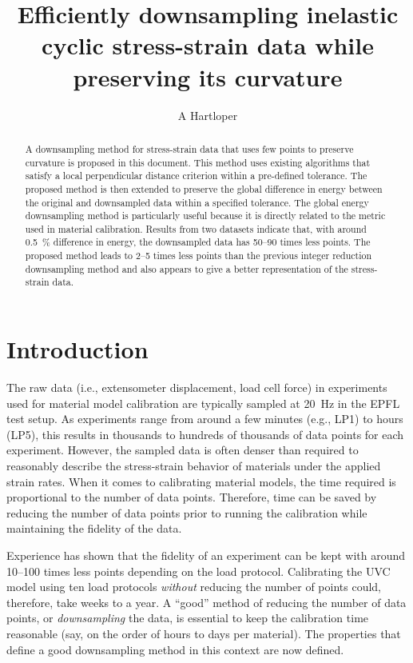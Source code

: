 \documentclass[a4paper,11pt]{article}
\title{Efficiently downsampling inelastic cyclic stress-strain data while preserving its curvature}
\author{A Hartloper}
\begin{document}
\maketitle

\begin{abstract}
    A downsampling method for stress-strain data that uses few points to preserve curvature is proposed in this document.
    This method uses existing algorithms that satisfy a local perpendicular distance criterion within a pre-defined tolerance.
    The proposed method is then extended to preserve the global difference in energy between the original and downsampled data within a specified tolerance.
    The global energy downsampling method is particularly useful because it is directly related to the metric used in material calibration.
    Results from two datasets indicate that, with around 0.5~\% difference in energy, the downsampled data has 50--90 times less points.
    The proposed method leads to 2--5 times less points than the previous integer reduction downsampling method and also appears to give a better representation of the stress-strain data.
\end{abstract}

\section{Introduction}

The raw data (i.e., extensometer displacement, load cell force) in experiments used for material model calibration are typically sampled at 20~Hz in the EPFL test setup.
As experiments range from around a few minutes (e.g., LP1) to hours (LP5), this results in thousands to hundreds of thousands of data points for each experiment.
However, the sampled data is often denser than required to reasonably describe the stress-strain behavior of materials under the applied strain rates.
When it comes to calibrating material models, the time required is proportional to the number of data points.
Therefore, time can be saved by reducing the number of data points prior to running the calibration while maintaining the fidelity of the data.

Experience has shown that the fidelity of an experiment can be kept with around 10--100 times less points depending on the load protocol.
Calibrating the UVC model using ten load protocols \emph{without} reducing the number of points could, therefore, take weeks to a year.
A ``good'' method of reducing the number of data points, or \emph{downsampling} the data, is essential to keep the calibration time reasonable (say, on the order of hours to days per material).
The properties that define a good downsampling method in this context are now defined.
\end{document}
